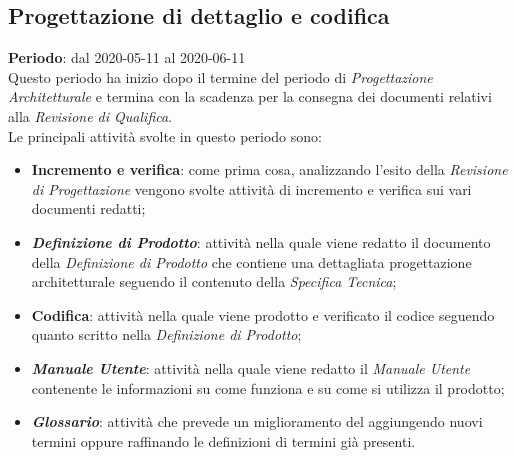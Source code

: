 \subsection{Progettazione di dettaglio e codifica}
\textbf{Periodo}: dal 2020-05-11 al 2020-06-11 \\
Questo periodo ha inizio dopo il termine del periodo di \textit{Progettazione Architetturale} e termina con la scadenza per la consegna dei documenti relativi alla \textit{Revisione di Qualifica}. \\
Le principali attività svolte in questo periodo sono:
\begin{itemize}
	\item \textbf{Incremento e verifica}: come prima cosa, analizzando l'esito della \textit{Revisione di Progettazione} vengono svolte attività di incremento e verifica sui vari documenti redatti;
	\item \textbf{\textit{Definizione di Prodotto}}: attività nella quale viene redatto il documento della \textit{Definizione di Prodotto} che contiene una dettagliata progettazione architetturale seguendo il contenuto della \textit{Specifica Tecnica};
	\item \textbf{Codifica}: attività nella quale viene prodotto e verificato il codice seguendo quanto scritto nella \textit{Definizione di Prodotto};
	\item \textbf{\textit{Manuale Utente}}: attività nella quale viene redatto il \textit{Manuale Utente} contenente le informazioni su come funziona e su come si utilizza il prodotto;
	\item \textbf{\textit{Glossario}}: attività che prevede un miglioramento del \textit{\Glossario{}} aggiungendo nuovi termini oppure raffinando le definizioni di termini già presenti.
\end{itemize}

